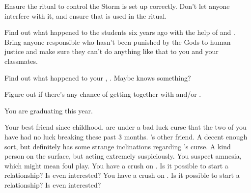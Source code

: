 \documentclass[char]{GL2020}
\begin{document}
\begin{itemz}[Goals]
	\item  Ensure the ritual to control the Storm is set up correctly. Don't let anyone interfere with it, and ensure that \iNet{} is used in the ritual.
	\item Find out what happened to the students six years ago with the help of \cHeir{} and \cLibAssist{}. Bring anyone responsible who hasn't been punished by the Gods to human justice and make sure they can't do anything like that to you and your classmates.
	\item Find out what happened to your \cHeadDiplomat{\auncle}, \cHeadDiplomat{}. Maybe \cEbbPriest{} knows something?
	\item Figure out if there's any chance of getting together with \cHeir{} and/or \cChupStudent{}.
\end{itemz}

\begin{itemz}[Notes]
	\item You are graduating this year.
\end{itemz}

\begin{contacts}
	\contact{\cInitiate{}} Your best friend since childhood. \cInitiate{\They} are under a bad luck curse that the two of you have had no luck breaking these past 3 months.
	\contact{\cWarlordDaughter{}} \cInitiate{}’s other friend. A decent enough sort, but definitely has some strange inclinations regarding \cInitiate{}’s curse.
\contact{\cLibrarian{}} A kind person on the surface, but acting extremely suspiciously. You suspect amnesia, which might mean foul play.
	\contact{\cHeir{}} You have a crush on \cHeir{\them}. Is it possible to start a relationship? Is \cHeir{} even interested?
	\contact{\cChupStudent{}} You have a crush on \cChupStudent{\them}. Is it possible to start a relationship? Is \cChupStudent{} even interested?
\end{contacts}
\end{document}

